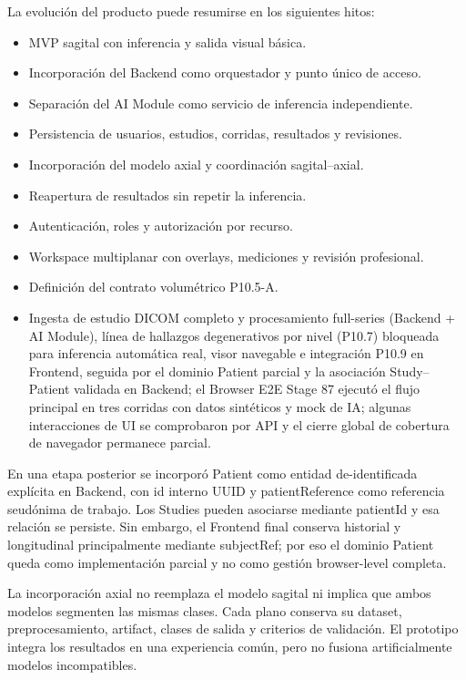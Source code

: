 La evolución del producto puede resumirse en los siguientes hitos:

\begin{itemize}
  \item MVP sagital con inferencia y salida visual básica.
  \item Incorporación del Backend como orquestador y punto único de acceso.
  \item Separación del AI Module como servicio de inferencia independiente.
  \item Persistencia de usuarios, estudios, corridas, resultados y revisiones.
  \item Incorporación del modelo axial y coordinación sagital–axial.
  \item Reapertura de resultados sin repetir la inferencia.
  \item Autenticación, roles y autorización por recurso.
  \item Workspace multiplanar con overlays, mediciones y revisión profesional.
  \item Definición del contrato volumétrico P10.5-A.
  \item Ingesta de estudio DICOM completo y procesamiento full-series (Backend + AI Module), línea de hallazgos degenerativos por nivel (P10.7) bloqueada para inferencia automática real, visor navegable e integración P10.9 en Frontend, seguida por el dominio Patient parcial y la asociación Study--Patient validada en Backend; el Browser E2E Stage 87 ejecutó el flujo principal en tres corridas con datos sintéticos y mock de IA; algunas interacciones de UI se comprobaron por API y el cierre global de cobertura de navegador permanece parcial.
\end{itemize}

En una etapa posterior se incorporó Patient como entidad de-identificada explícita en Backend, con id interno UUID y patientReference como referencia seudónima de trabajo. Los Studies pueden asociarse mediante patientId y esa relación se persiste. Sin embargo, el Frontend final conserva historial y longitudinal principalmente mediante subjectRef; por eso el dominio Patient queda como implementación parcial y no como gestión browser-level completa.

La incorporación axial no reemplaza el modelo sagital ni implica que ambos modelos segmenten las mismas clases. Cada plano conserva su dataset, preprocesamiento, artifact, clases de salida y criterios de validación. El prototipo integra los resultados en una experiencia común, pero no fusiona artificialmente modelos incompatibles.

